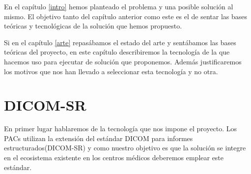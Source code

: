 En el capítulo \ref{intro} hemos planteado el problema y una posible solución al mismo. El objetivo tanto del capítulo anterior como este es el de sentar las bases teóricas y tecnológicas de la solución que hemos propuesto.\par 
Si en el capítulo  \ref{arte} repasábamos el estado del arte y sentábamos las bases teóricas del proyecto, en este capítulo describiremos la tecnología de la que hacemos uso para ejecutar de solución que proponemos. Además justificaremos los motivos que nos han llevado a seleccionar esta tecnología y no otra.\par

\section{DICOM-SR}\label{dicomSR}
En primer lugar hablaremos de la tecnología que nos impone el proyecto. Los PACs utilizan la extensión del estándar DICOM para informes estructurados(DICOM-SR) y como nuestro objetivo es que la solución se integre en el ecosistema existente en los centros médicos deberemos emplear este estándar.\medskip\par

